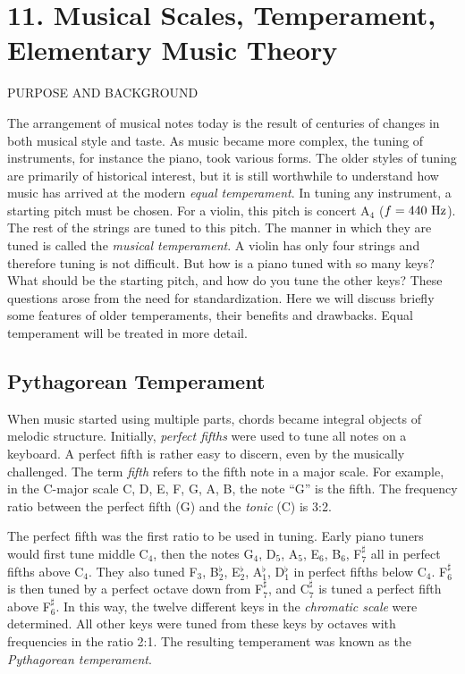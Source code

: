 \documentclass[11pt]{NSF}
\begin{document}
     
\section{11. Musical Scales, Temperament, Elementary Music Theory}

PURPOSE AND BACKGROUND

The arrangement of musical notes today is the result of centuries of
changes in both musical style and taste. As music became more complex,
the tuning of instruments, for instance the piano, took various forms.
The older styles of tuning are primarily of historical interest, but
it is still worthwhile to understand how music has arrived at the
modern {\em equal temperament}. 
In tuning any instrument, a starting pitch
must be chosen. For a violin, this pitch is concert A$_4$ 
($f=440~{\rm Hz}$).
The rest of the strings are tuned to this pitch. The manner in which
they are tuned is called the {\em musical temperament}. 
A violin has only
four strings and therefore tuning is not difficult. But how is a piano
tuned with so many keys? What should be the starting pitch, and how do
you tune the other keys? These questions arose from the need for
standardization. Here we will discuss briefly some features of
older temperaments, their benefits and drawbacks. 
Equal temperament will be treated in more detail.

\subsection{Pythagorean Temperament}

When music started using multiple parts, chords became integral
objects of melodic structure. Initially, {\em perfect fifths} were used to
tune all notes on a keyboard. A perfect fifth is rather easy to
discern, even by the musically challenged. The term {\em fifth} refers to
the fifth note in a major scale. For example, in the C-major scale C,
D, E, F, G, A, B, the note “G” is the fifth. The frequency ratio
between the perfect fifth (G) and the {\em tonic} (C) is 3:2.

The perfect fifth was the first ratio to be used in tuning. 
Early piano tuners
would first tune middle C$_4$, then the notes G$_4$, D$_5$, A$_5$,
E$_6$, B$_6$, F$^\sharp_7$ all in perfect fifths above C$_4$. 
They also tuned F$_3$, B$^\flat_2$, E$^\flat_2$, A$^\flat_1$, D$^\flat_1$ in
perfect fifths below C$_4$. 
F$^\sharp_6$ is then tuned by a perfect octave down
from F$^\sharp_7$, and C$^\sharp_7$ is tuned a perfect fifth above
F$^\sharp_6$. In this way, the
twelve different keys in the {\em chromatic scale} were determined. 
All other keys were tuned from these keys by octaves with frequencies in
the ratio 2:1. The resulting temperament was known as the {\em Pythagorean
temperament}.
\end{document}
